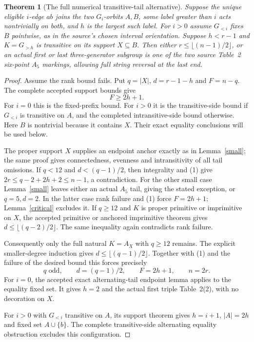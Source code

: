 \documentclass[11pt,a4paper]{article}
\newtheorem{theorem}[lemma]{Theorem}
\begin{document}
\begin{theorem}[The full numerical transitive-tail alternative]
Suppose the unique eligible $i$-edge $ab$ joins the two
$G_i$-orbits $A,B$, some label greater than $i$ acts
nontrivially on both, and $h$ is the largest such label.
For $i>0$ assume $G_{<i}$ fixes $B$ pointwise, as in the
source's chosen interval orientation. Suppose $h<r-1$ and
$K=G_{>h}$ is transitive on its support $X\subseteq B$.
Then either $r\leq\lfloor(n-1)/2\rfloor$, or an actual
first or last three-generator subgroup is one of the two
source Table~2 six-point $A_5$ markings, allowing full
string reversal at the last end.
\end{theorem}
\begin{proof}
Assume the rank bound fails. Put $q=|X|$, $d=r-1-h$ and
$F=n-q$. The complete accepted support bounds give
\[
                            F\geq2h+1.                 \tag{1}
\]
For $i=0$ this is the fixed-prefix bound. For $i>0$ it is
the transitive-side bound if $G_{<i}$ is transitive on $A$,
and the completed intransitive-side bound otherwise.
Here $B$ is nontrivial because it contains $X$.
Their exact equality conclusions will be used below.

The proper support $X$ supplies an endpoint anchor exactly
as in Lemma~\ref{small}; the same proof gives connectedness,
evenness and intransitivity of all tail omissions.
If $q<12$ and $d<(q-1)/2$, then integrality and (1) give
$2r\leq q-2+2h+2\leq n-1$, a contradiction.
For the other small case Lemma~\ref{small} leaves either
an actual $A_5$ tail, giving the stated exception, or
$q=5,d=2$. In the latter case rank failure and (1) force
$F=2h+1$; Lemma~\ref{critical} excludes it. If $q\geq12$ and $K$ is proper primitive or
imprimitive on $X$, the accepted primitive or anchored
imprimitive theorem gives $d\leq\lfloor(q-2)/2\rfloor$.
The same inequality again contradicts rank failure.

Consequently only the full natural $K=A_X$ with $q\geq12$
remains. The explicit smaller-degree induction gives
$d\leq\lfloor(q-1)/2\rfloor$. Together with (1) and the
failure of the desired bound this forces precisely
\[
 q\text{ odd},\qquad d=(q-1)/2,\qquad
 F=2h+1,\qquad n=2r.                                   \tag{2}
\]
For $i=0$, the accepted exact alternating-tail endpoint
lemma applies to the equality fixed set. It gives $h=2$
and the actual first triple Table~2(2), with no decoration
on $X$.

For $i>0$ with $G_{<i}$ transitive on $A$, its support
theorem gives $h=i+1$, $|A|=2h$ and fixed set
$A\cup\{b\}$. The complete transitive-side alternating
equality obstruction excludes this configuration.


\end{proof}
\end{document}
